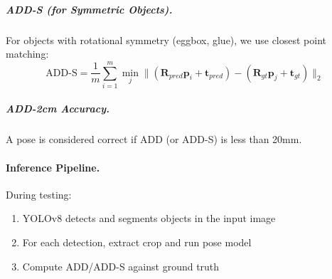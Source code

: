 \subparagraph{ADD-S (for Symmetric Objects).}
For objects with rotational symmetry (eggbox, glue), we use closest point matching:
\begin{equation}
    \text{ADD-S} = \frac{1}{m}\sum_{i=1}^{m} \min_{j} \|(\mathbf{R}_{pred} \mathbf{p}_i + \mathbf{t}_{pred}) - (\mathbf{R}_{gt} \mathbf{p}_j + \mathbf{t}_{gt})\|_2
\end{equation}

\subparagraph{ADD-2cm Accuracy.}
A pose is considered correct if ADD (or ADD-S) is less than 20mm.

\paragraph{Inference Pipeline.}
During testing:
\begin{enumerate}
    \item YOLOv8 detects and segments objects in the input image
    \item For each detection, extract crop and run pose model
    \item Compute ADD/ADD-S against ground truth
\end{enumerate}
